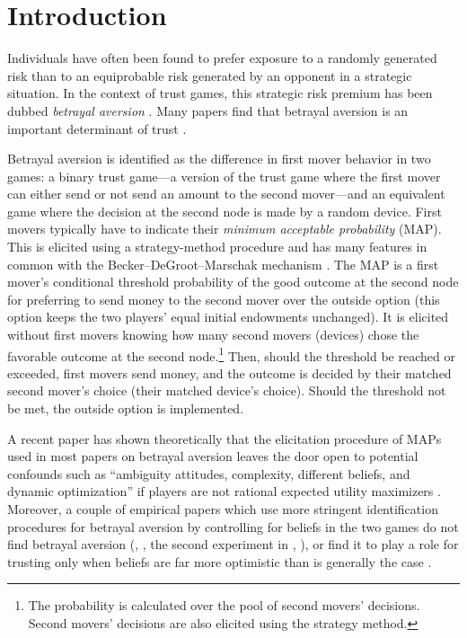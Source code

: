 \section{Introduction}\label{sec:intro}
Individuals have often been found to prefer exposure to a randomly generated risk than to an equiprobable risk generated by an opponent in a strategic situation.
In the context of trust games, this strategic risk premium has been dubbed \textit{betrayal aversion} \citep{Bohnet2004}.
Many papers find that betrayal aversion is an important determinant of trust \citep{Bohnet2004, Aimone2015, Fairley2016, Quercia2016, Bacine2018, Butler2018, Polipciuc2021}.

Betrayal aversion is identified as the difference in first mover behavior in two games: a binary trust game---a version of the trust game \citep{Berg1995} where the first mover can either send or not send an amount to the second mover---and an equivalent game where the decision at the second node is made by a random device.
First movers typically have to indicate their \textit{minimum acceptable probability} (MAP).
This is elicited using a strategy-method procedure \citep{Selten1967} and has many features in common with the Becker--DeGroot--Marschak mechanism \citep[BDM]{Becker1964}.
The MAP is a first mover's conditional threshold probability of the good outcome at the second node for preferring to send money to the second mover over the outside option (this option keeps the two players' equal initial endowments unchanged).
It is elicited without first movers knowing how many second movers (devices) chose the favorable outcome at the second node.\footnote{
The probability is calculated over the pool of second movers' decisions.
Second movers' decisions are also elicited using the strategy method.
}
Then, should the threshold be reached or exceeded, first movers send money, and the outcome is decided by their matched second mover's choice (their matched device's choice).
Should the threshold not be met, the outside option is implemented.

A recent paper has shown theoretically that the elicitation procedure of MAPs used in most papers on betrayal aversion leaves the door open to potential confounds such as ``ambiguity attitudes, complexity, different beliefs, and dynamic optimization'' if players are not rational expected utility maximizers \citep{Li2020a}.
Moreover, a couple of empirical papers which use more stringent identification procedures for betrayal aversion by controlling for beliefs in the two games do not find betrayal aversion (\citeauthor{Fetchenhauer2012}, \citeyear{Fetchenhauer2012}, the second experiment in \citeauthor{Polipciuc2021}, \citeyear{Polipciuc2021}), or find it to play a role for trusting only when beliefs are far more optimistic than is generally the case \citep{Engelmann2021}.

